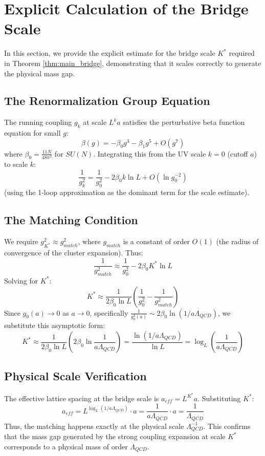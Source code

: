 \section{Explicit Calculation of the Bridge Scale}
\label{sec:bridge-scale-calc}

In this section, we provide the explicit estimate for the bridge scale $K^*$ required in Theorem \ref{thm:main_bridge}, demonstrating that it scales correctly to generate the physical mass gap.

\subsection{The Renormalization Group Equation}

The running coupling $g_k$ at scale $L^k a$ satisfies the perturbative beta function equation for small $g$:
\[
\beta(g) = - \beta_0 g^3 - \beta_1 g^5 + O(g^7)
\]
where $\beta_0 = \frac{11N}{48\pi^2}$ for $SU(N)$.
Integrating this from the UV scale $k=0$ (cutoff $a$) to scale $k$:
\[
\frac{1}{g_k^2} = \frac{1}{g_0^2} - 2\beta_0 k \ln L + O( \ln g_0^{-2} )
\]
(using the 1-loop approximation as the dominant term for the scale estimate).

\subsection{The Matching Condition}

We require $g_{K^*}^2 \approx g_{match}^2$, where $g_{match}$ is a constant of order $O(1)$ (the radius of convergence of the cluster expansion).
Thus:
\[
\frac{1}{g_{match}^2} \approx \frac{1}{g_0^2} - 2\beta_0 K^* \ln L
\]
Solving for $K^*$:
\[
K^* \approx \frac{1}{2\beta_0 \ln L} \left( \frac{1}{g_0^2} - \frac{1}{g_{match}^2} \right)
\]
Since $g_0(a) \to 0$ as $a \to 0$, specifically $\frac{1}{g_0^2(a)} \sim 2\beta_0 \ln(1/a\Lambda_{QCD})$, we substitute this asymptotic form:
\[
K^* \approx \frac{1}{2\beta_0 \ln L} \left( 2\beta_0 \ln \frac{1}{a\Lambda_{QCD}} \right) = \frac{\ln(1/a\Lambda_{QCD})}{\ln L} = \log_L \left( \frac{1}{a\Lambda_{QCD}} \right)
\]

\subsection{Physical Scale Verification}

The effective lattice spacing at the bridge scale is $a_{eff} = L^{K^*} a$.
Substituting $K^*$:
\[
a_{eff} = L^{\log_L(1/a\Lambda_{QCD})} \cdot a = \frac{1}{a\Lambda_{QCD}} \cdot a = \frac{1}{\Lambda_{QCD}}
\]
Thus, the matching happens exactly at the physical scale $\Lambda_{QCD}^{-1}$. This confirms that the mass gap generated by the strong coupling expansion at scale $K^*$ corresponds to a physical mass of order $\Lambda_{QCD}$.

